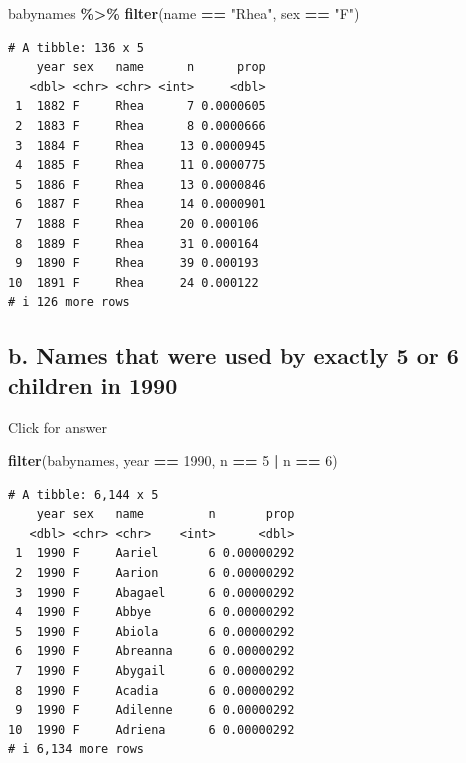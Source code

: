 \documentclass[
]{book}
\newenvironment{Shaded}{\begin{snugshade}}{\end{snugshade}}
\newcommand{\DecValTok}[1]{\textcolor[rgb]{0.00,0.00,0.81}{#1}}
\newcommand{\FunctionTok}[1]{\textcolor[rgb]{0.13,0.29,0.53}{\textbf{#1}}}
\newcommand{\NormalTok}[1]{#1}
\newcommand{\SpecialCharTok}[1]{\textcolor[rgb]{0.81,0.36,0.00}{\textbf{#1}}}
\newcommand{\StringTok}[1]{\textcolor[rgb]{0.31,0.60,0.02}{#1}}
\begin{document}
\begin{Shaded}
\begin{Highlighting}[]
\NormalTok{babynames }\SpecialCharTok{\%\textgreater{}\%}  \FunctionTok{filter}\NormalTok{(name }\SpecialCharTok{==} \StringTok{"Rhea"}\NormalTok{, sex }\SpecialCharTok{==} \StringTok{"F"}\NormalTok{)}
\end{Highlighting}
\end{Shaded}

\begin{verbatim}
# A tibble: 136 x 5
    year sex   name      n      prop
   <dbl> <chr> <chr> <int>     <dbl>
 1  1882 F     Rhea      7 0.0000605
 2  1883 F     Rhea      8 0.0000666
 3  1884 F     Rhea     13 0.0000945
 4  1885 F     Rhea     11 0.0000775
 5  1886 F     Rhea     13 0.0000846
 6  1887 F     Rhea     14 0.0000901
 7  1888 F     Rhea     20 0.000106 
 8  1889 F     Rhea     31 0.000164 
 9  1890 F     Rhea     39 0.000193 
10  1891 F     Rhea     24 0.000122 
# i 126 more rows
\end{verbatim}

\hypertarget{b.-names-that-were-used-by-exactly-5-or-6-children-in-1990}{%
\subsection{b. Names that were used by exactly 5 or 6 children in 1990}\label{b.-names-that-were-used-by-exactly-5-or-6-children-in-1990}}

Click for answer

\begin{Shaded}
\begin{Highlighting}[]
\FunctionTok{filter}\NormalTok{(babynames, year }\SpecialCharTok{==} \DecValTok{1990}\NormalTok{, n }\SpecialCharTok{==} \DecValTok{5} \SpecialCharTok{|}\NormalTok{ n }\SpecialCharTok{==} \DecValTok{6}\NormalTok{)}
\end{Highlighting}
\end{Shaded}

\begin{verbatim}
# A tibble: 6,144 x 5
    year sex   name         n       prop
   <dbl> <chr> <chr>    <int>      <dbl>
 1  1990 F     Aariel       6 0.00000292
 2  1990 F     Aarion       6 0.00000292
 3  1990 F     Abagael      6 0.00000292
 4  1990 F     Abbye        6 0.00000292
 5  1990 F     Abiola       6 0.00000292
 6  1990 F     Abreanna     6 0.00000292
 7  1990 F     Abygail      6 0.00000292
 8  1990 F     Acadia       6 0.00000292
 9  1990 F     Adilenne     6 0.00000292
10  1990 F     Adriena      6 0.00000292
# i 6,134 more rows
\end{verbatim}
\end{document}
